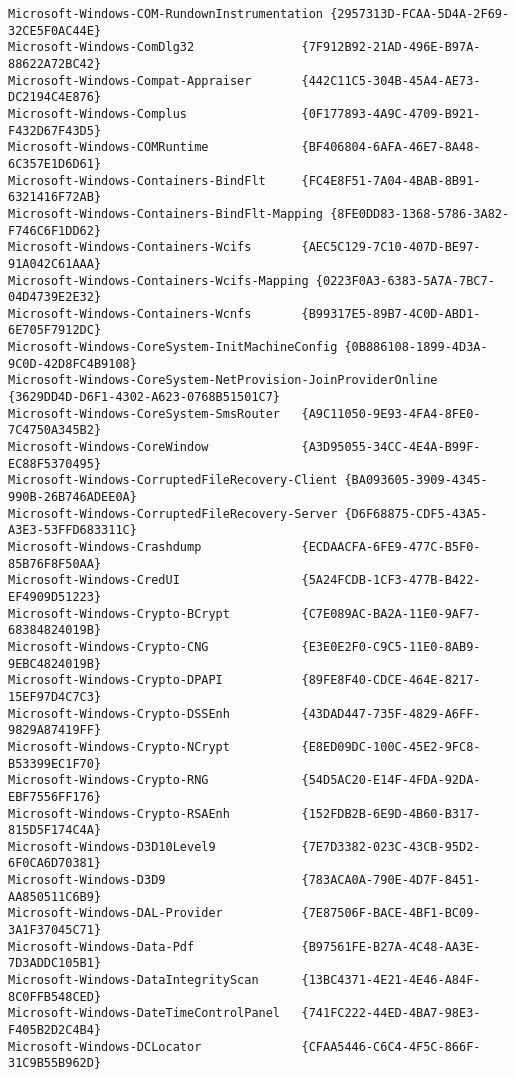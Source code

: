 \documentclass{report}
\begin{document}
\begin{lstlisting}[breaklines=true,basicstyle=\tiny]
Microsoft-Windows-COM-RundownInstrumentation {2957313D-FCAA-5D4A-2F69-32CE5F0AC44E}
Microsoft-Windows-ComDlg32               {7F912B92-21AD-496E-B97A-88622A72BC42}
Microsoft-Windows-Compat-Appraiser       {442C11C5-304B-45A4-AE73-DC2194C4E876}
Microsoft-Windows-Complus                {0F177893-4A9C-4709-B921-F432D67F43D5}
Microsoft-Windows-COMRuntime             {BF406804-6AFA-46E7-8A48-6C357E1D6D61}
Microsoft-Windows-Containers-BindFlt     {FC4E8F51-7A04-4BAB-8B91-6321416F72AB}
Microsoft-Windows-Containers-BindFlt-Mapping {8FE0DD83-1368-5786-3A82-F746C6F1DD62}
Microsoft-Windows-Containers-Wcifs       {AEC5C129-7C10-407D-BE97-91A042C61AAA}
Microsoft-Windows-Containers-Wcifs-Mapping {0223F0A3-6383-5A7A-7BC7-04D4739E2E32}
Microsoft-Windows-Containers-Wcnfs       {B99317E5-89B7-4C0D-ABD1-6E705F7912DC}
Microsoft-Windows-CoreSystem-InitMachineConfig {0B886108-1899-4D3A-9C0D-42D8FC4B9108}
Microsoft-Windows-CoreSystem-NetProvision-JoinProviderOnline {3629DD4D-D6F1-4302-A623-0768B51501C7}
Microsoft-Windows-CoreSystem-SmsRouter   {A9C11050-9E93-4FA4-8FE0-7C4750A345B2}
Microsoft-Windows-CoreWindow             {A3D95055-34CC-4E4A-B99F-EC88F5370495}
Microsoft-Windows-CorruptedFileRecovery-Client {BA093605-3909-4345-990B-26B746ADEE0A}
Microsoft-Windows-CorruptedFileRecovery-Server {D6F68875-CDF5-43A5-A3E3-53FFD683311C}
Microsoft-Windows-Crashdump              {ECDAACFA-6FE9-477C-B5F0-85B76F8F50AA}
Microsoft-Windows-CredUI                 {5A24FCDB-1CF3-477B-B422-EF4909D51223}
Microsoft-Windows-Crypto-BCrypt          {C7E089AC-BA2A-11E0-9AF7-68384824019B}
Microsoft-Windows-Crypto-CNG             {E3E0E2F0-C9C5-11E0-8AB9-9EBC4824019B}
Microsoft-Windows-Crypto-DPAPI           {89FE8F40-CDCE-464E-8217-15EF97D4C7C3}
Microsoft-Windows-Crypto-DSSEnh          {43DAD447-735F-4829-A6FF-9829A87419FF}
Microsoft-Windows-Crypto-NCrypt          {E8ED09DC-100C-45E2-9FC8-B53399EC1F70}
Microsoft-Windows-Crypto-RNG             {54D5AC20-E14F-4FDA-92DA-EBF7556FF176}
Microsoft-Windows-Crypto-RSAEnh          {152FDB2B-6E9D-4B60-B317-815D5F174C4A}
Microsoft-Windows-D3D10Level9            {7E7D3382-023C-43CB-95D2-6F0CA6D70381}
Microsoft-Windows-D3D9                   {783ACA0A-790E-4D7F-8451-AA850511C6B9}
Microsoft-Windows-DAL-Provider           {7E87506F-BACE-4BF1-BC09-3A1F37045C71}
Microsoft-Windows-Data-Pdf               {B97561FE-B27A-4C48-AA3E-7D3ADDC105B1}
Microsoft-Windows-DataIntegrityScan      {13BC4371-4E21-4E46-A84F-8C0FFB548CED}
Microsoft-Windows-DateTimeControlPanel   {741FC222-44ED-4BA7-98E3-F405B2D2C4B4}
Microsoft-Windows-DCLocator              {CFAA5446-C6C4-4F5C-866F-31C9B55B962D}

\end{lstlisting}
\end{document}
